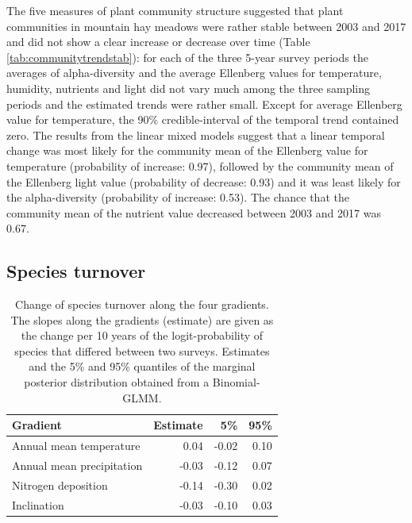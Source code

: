 \documentclass[fleqn,10pt,lineno]{wlpeerj} %
\theoremstyle{definition}
\theoremstyle{definition}
\theoremstyle{definition}
\theoremstyle{remark}
\begin{document}
The five measures of plant community structure suggested that plant
communities in mountain hay meadows were rather stable between 2003 and
2017 and did not show a clear increase or decrease over time (Table
\ref{tab:communitytrendstab}): for each of the three 5-year survey
periods the averages of alpha-diversity and the average Ellenberg values
for temperature, humidity, nutrients and light did not vary much among
the three sampling periods and the estimated trends were rather small.
Except for average Ellenberg value for temperature, the 90\%
credible-interval of the temporal trend contained zero. The results from
the linear mixed models suggest that a linear temporal change was most
likely for the community mean of the Ellenberg value for temperature
(probability of increase: 0.97), followed by the community mean of the
Ellenberg light value (probability of decrease: 0.93) and it was least
likely for the alpha-diversity (probability of increase: 0.53). The
chance that the community mean of the nutrient value decreased between
2003 and 2017 was 0.67.

\subsection*{Species turnover}\label{species-turnover}

\begin{table}

\caption{\label{tab:turnovertab}Change of species turnover along the four gradients. The slopes along the gradients (estimate) are given as the change per 10 years of the logit-probability of species that differed between two surveys. Estimates and the 5\% and 95\% quantiles of the marginal posterior distribution obtained from a Binomial-GLMM.}
\centering
\begin{tabular}[t]{lrrr}
\toprule
Gradient & Estimate & 5\% & 95\%\\
\midrule
Annual mean temperature & 0.04 & -0.02 & 0.10\\
Annual mean precipitation & -0.03 & -0.12 & 0.07\\
Nitrogen deposition & -0.14 & -0.30 & 0.02\\
Inclination & -0.03 & -0.10 & 0.03\\
\bottomrule
\end{tabular}
\end{table}
\end{document}
